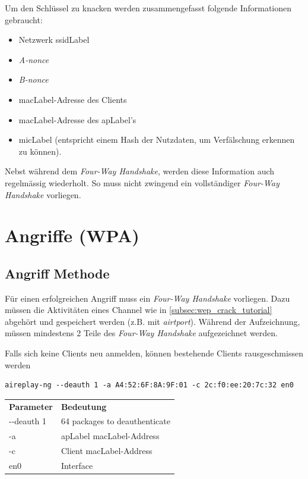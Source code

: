 
Um den Schlüssel zu knacken werden zusammengefasst folgende Informationen gebraucht:
\begin{itemize}
	\item Netzwerk \gls{ssidLabel}
	\item \textit{A-nonce}
	\item \textit{B-nonce}
	\item \gls{macLabel}-Adresse des Clients
	\item \gls{macLabel}-Adresse des \gls{apLabel}'s
	\item \gls{micLabel} (entspricht einem Hash der Nutzdaten, um Verfälschung erkennen zu können).
\end{itemize}

Nebst während dem \textit{Four-Way Handshake}, werden diese Information auch regelmässig wiederholt.
So muss nicht zwingend ein vollständiger \textit{Four-Way Handshake} vorliegen.


\section{Angriffe (WPA)}

\subsection{Angriff Methode}
Für einen erfolgreichen Angriff muss ein \textit{Four-Way Handshake} vorliegen.
Dazu müssen die Aktivitäten eines Channel wie in \cref{subsec:wep_crack_tutorial} abgehört und gespeichert werden (z.B. mit \textit{airtport}).
Während der Aufzeichnung, müssen mindestens 2 Teile des \textit{Four-Way Handshake} aufgezeichnet werden.

Falls sich keine Clients neu anmelden, können bestehende Clients rausgeschmissen werden
\begin{lstlisting}[style=lstStyleFramed]
aireplay-ng --deauth 1 -a A4:52:6F:8A:9F:01 -c 2c:f0:ee:20:7c:32 en0
\end{lstlisting}
\begin{tabular}{l l}
	\textbf{Parameter} & \textbf{Bedeutung}\\
	-{}-deauth 1 & 64 packages to deauthenticate\\
	-a	& \gls{apLabel} \gls{macLabel}-Address\\
	-c	& Client \gls{macLabel}-Address\\
	en0 & Interface
\end{tabular}


